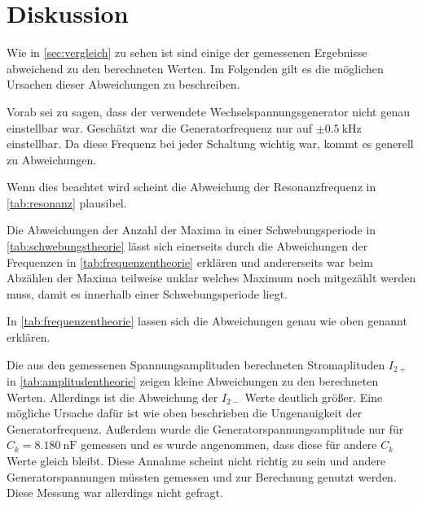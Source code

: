 \section{Diskussion}
\label{sec:Diskussion}


Wie in \autoref{sec:vergleich} zu sehen ist sind einige der gemessenen Ergebnisse abweichend zu den berechneten Werten. Im Folgenden gilt es die möglichen Ursachen dieser Abweichungen zu beschreiben.

Vorab sei zu sagen, dass der verwendete Wechselspannungsgenerator nicht genau einstellbar war. Geschätzt war die Generatorfrequenz nur auf $\pm \SI{0.5}{\kilo\hertz}$ einstellbar. 
Da diese Frequenz bei jeder Schaltung wichtig war, kommt es generell zu Abweichungen.

Wenn dies beachtet wird scheint die Abweichung der Resonanzfrequenz in \autoref{tab:resonanz} plausibel.

Die Abweichungen der Anzahl der Maxima in einer Schwebungsperiode in \autoref{tab:schwebungstheorie} lässt sich einerseits durch die Abweichungen der Frequenzen in \autoref{tab:frequenzentheorie} erklären und andererseits war beim Abzählen der Maxima teilweise unklar welches Maximum noch mitgezählt werden muss, damit es innerhalb einer Schwebungsperiode liegt.

In \autoref{tab:frequenzentheorie} lassen sich die Abweichungen genau wie oben genannt erklären.

Die aus den gemessenen Spannungsamplituden berechneten Stromaplituden $I_{2+}$ in \autoref{tab:amplitudentheorie} zeigen kleine Abweichungen zu den berechneten Werten.
Allerdings ist die Abweichung der $I_{2-}$ Werte deutlich größer. 
Eine mögliche Ursache dafür ist wie oben beschrieben die Ungenauigkeit der Generatorfrequenz. Außerdem wurde die Generatorspannungsamplitude nur für $C_k = \SI{8.180}{\nano\farad}$ gemessen und es wurde angenommen, dass diese für andere $C_k$ Werte gleich bleibt. Diese Annahme scheint nicht richtig zu sein und andere Generatorspannungen müssten gemessen und zur Berechnung genutzt werden. Diese Messung war allerdings nicht gefragt.